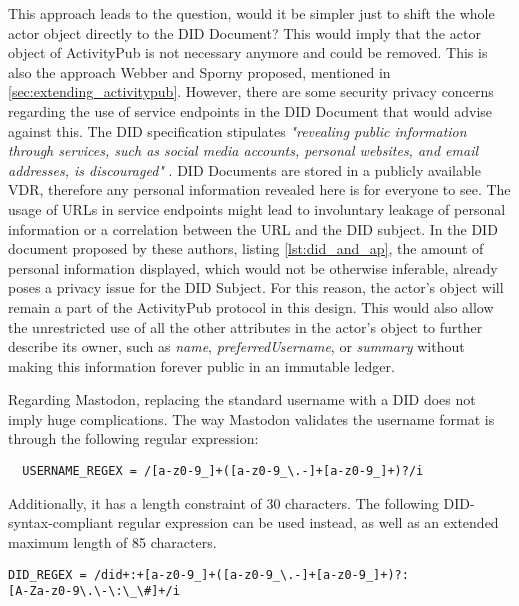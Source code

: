 This approach leads to the question, would it be simpler just to shift the whole actor object directly to the DID Document? This would imply that the actor object of ActivityPub is not necessary anymore and could be removed. This is also the approach Webber and Sporny proposed, mentioned in \ref{sec:extending_activitypub}. However, there are some security privacy concerns regarding the use of service endpoints in the DID Document that would advise against this. The DID specification stipulates \emph{"revealing public information through services, such as social media accounts, personal websites, and email addresses, is discouraged"} \cite{sporny_longley_sabadello_reed_steele_2021}. DID Documents are stored in a publicly available VDR, therefore any personal information revealed here is for everyone to see. The usage of URLs in service endpoints might lead to involuntary leakage of personal information or a correlation between the URL and the DID subject. In the DID document proposed by these authors, listing \ref{lst:did_and_ap}, the amount of personal information displayed, which would not be otherwise inferable, already poses a privacy issue for the DID Subject. For this reason, the actor's object will remain a part of the ActivityPub protocol in this design. This would also allow the unrestricted use of all the other attributes in the actor's object to further describe its owner, such as \emph{name}, \emph{preferredUsername}, or \emph{summary} without making this information forever public in an immutable ledger.

Regarding Mastodon, replacing the standard username with a DID does not imply huge complications. The way Mastodon validates the username format is through the following regular expression: 

\begin{verbatim}
  USERNAME_REGEX = /[a-z0-9_]+([a-z0-9_\.-]+[a-z0-9_]+)?/i
\end{verbatim}

Additionally, it has a length constraint of 30 characters. The following DID-syntax-compliant regular expression can be used instead, as well as an extended maximum length of 85 characters. 

\verb|DID_REGEX = /did+:+[a-z0-9_]+([a-z0-9_\.-]+[a-z0-9_]+)?:|\\\verb|[A-Za-z0-9\.\-\:\_\#]+/i |


